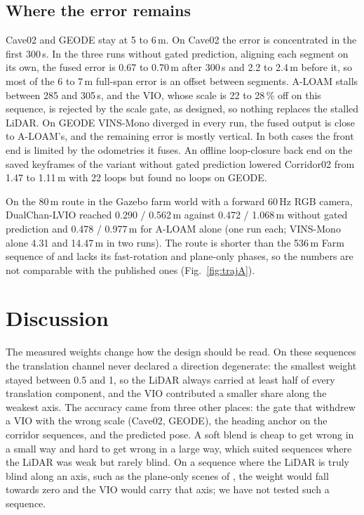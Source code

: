 \documentclass[journal]{IEEEtran}
\begin{document}
\subsection{Where the error remains}
Cave02 and GEODE stay at 5 to 6\,m. On Cave02 the error is concentrated in the first 300\,s. In the three runs without gated prediction, aligning each segment on its own, the fused error is 0.67 to 0.70\,m after 300\,s and 2.2 to 2.4\,m before it, so most of the 6 to 7\,m full-span error is an offset between segments. A-LOAM stalls between 285 and 305\,s, and the VIO, whose scale is 22 to 28\,\% off on this sequence, is rejected by the scale gate, as designed, so nothing replaces the stalled LiDAR. On GEODE VINS-Mono diverged in every run, the fused output is close to A-LOAM's, and the remaining error is mostly vertical. In both cases the front end is limited by the odometries it fuses. An offline loop-closure back end on the saved keyframes of the variant without gated prediction lowered Corridor02 from 1.47 to 1.11\,m with 22 loops but found no loops on GEODE.




On the 80\,m route in the Gazebo farm world with a forward 60\,Hz RGB camera, DualChan-LVIO reached 0.290 / 0.562\,m against 0.472 / 1.068\,m without gated prediction and 0.478 / 0.977\,m for A-LOAM alone (one run each; VINS-Mono alone 4.31 and 14.47\,m in two runs). The route is shorter than the 536\,m Farm sequence of \cite{switchslam2024} and lacks its fast-rotation and plane-only phases, so the numbers are not comparable with the published ones (Fig.~\ref{fig:trajA}).

\section{Discussion}
The measured weights change how the design should be read. On these sequences the translation channel never declared a direction degenerate: the smallest weight stayed between 0.5 and 1, so the LiDAR always carried at least half of every translation component, and the VIO contributed a smaller share along the weakest axis. The accuracy came from three other places: the gate that withdrew a VIO with the wrong scale (Cave02, GEODE), the heading anchor on the corridor sequences, and the predicted pose. A soft blend is cheap to get wrong in a small way and hard to get wrong in a large way, which suited sequences where the LiDAR was weak but rarely blind. On a sequence where the LiDAR is truly blind along an axis, such as the plane-only scenes of \cite{switchslam2024}, the weight would fall towards zero and the VIO would carry that axis; we have not tested such a sequence.
\end{document}
